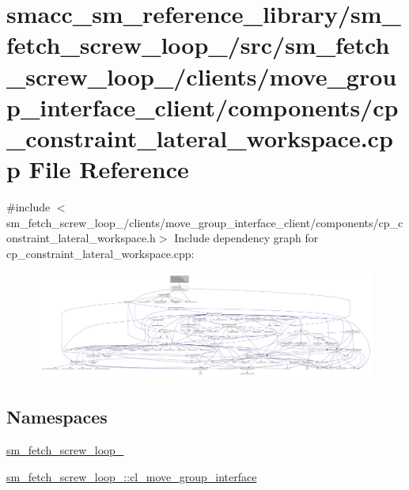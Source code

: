 \hypertarget{sm__fetch__screw__loop__1_2src_2sm__fetch__screw__loop__1_2clients_2move__group__interface__clieb2113844d572b8f574ad1d1a7cee9cc1}{}\section{smacc\+\_\+sm\+\_\+reference\+\_\+library/sm\+\_\+fetch\+\_\+screw\+\_\+loop\+\_/src/sm\+\_\+fetch\+\_\+screw\+\_\+loop\+\_/clients/move\+\_\+group\+\_\+interface\+\_\+client/components/cp\+\_\+constraint\+\_\+lateral\+\_\+workspace.cpp File Reference}
\label{sm__fetch__screw__loop__1_2src_2sm__fetch__screw__loop__1_2clients_2move__group__interface__clieb2113844d572b8f574ad1d1a7cee9cc1}
{\ttfamily \#include $<$sm\+\_\+fetch\+\_\+screw\+\_\+loop\+\_/clients/move\+\_\+group\+\_\+interface\+\_\+client/components/cp\+\_\+constraint\+\_\+lateral\+\_\+workspace.\+h$>$}\newline
Include dependency graph for cp\+\_\+constraint\+\_\+lateral\+\_\+workspace.\+cpp\+:
\nopagebreak
\begin{figure}[H]
\begin{center}
\leavevmode
\includegraphics[width=350pt]{sm__fetch__screw__loop__1_2src_2sm__fetch__screw__loop__1_2clients_2move__group__interface__cliea4a10e67fe26c4f96e49eca2d53ea103}
\end{center}
\end{figure}
\subsection*{Namespaces}
\begin{DoxyCompactItemize}
\item 
 \hyperlink{namespacesm__fetch__screw__loop__1}{sm\+\_\+fetch\+\_\+screw\+\_\+loop\+\_}
\item 
 \hyperlink{namespacesm__fetch__screw__loop__1_1_1cl__move__group__interface}{sm\+\_\+fetch\+\_\+screw\+\_\+loop\+\_\+::cl\+\_\+move\+\_\+group\+\_\+interface}
\end{DoxyCompactItemize}
